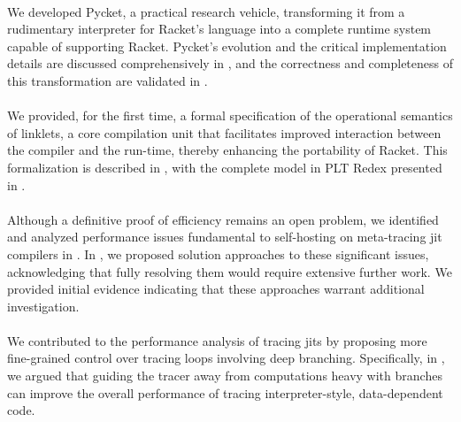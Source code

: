     \paragraph{}%
        We developed Pycket, a practical research vehicle, transforming it from a rudimentary interpreter for Racket's  language into a complete runtime system capable of supporting Racket. Pycket's evolution and the critical implementation details are discussed comprehensively in , and the correctness and completeness of this transformation are validated in .

    \paragraph{}%
        We provided, for the first time, a formal specification of the operational semantics of linklets, a core compilation unit that facilitates improved interaction between the compiler and the run-time, thereby enhancing the portability of Racket. This formalization is described in , with the complete model in PLT Redex presented in .

    \paragraph{}%
        Although a definitive proof of efficiency remains an open problem, we identified and analyzed performance issues fundamental to self-hosting on meta-tracing \gls{jit} compilers in . In , we proposed solution approaches to these significant issues, acknowledging that fully resolving them would require extensive further work. We provided initial evidence indicating that these approaches warrant additional investigation.

    \paragraph{}%
        We contributed to the performance analysis of tracing \glspl{jit} by proposing more fine-grained control over tracing loops involving deep branching. Specifically, in , we argued that guiding the tracer away from computations heavy with branches can improve the overall performance of tracing interpreter-style, data-dependent code.

